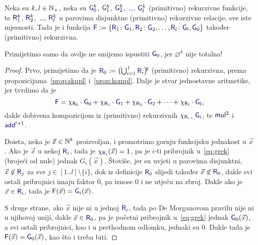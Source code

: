 \begin{teorem}\label{tm:grek}
Neka su $k,l\in{\mathbb N}_+$, neka su $\f G_0^k$, $\f G_1^k$, $\f G_2^k$,~\ldots, $\f G_l^k$ (primitivno) rekurzivne funkcije, te $\f R_1^k$, $\f R_2^k$,~\ldots, $\f R_l^k$ u parovima disjunktne (primitivno) rekurzivne relacije, sve iste mjesnosti. Tada je i funkcija $\f F:=\{\f R_1\colon\f G_1,\f R_2\colon\f G_2,\dotsc,\f R_l\colon\f G_l,\f G_0\}$ također (primitivno) rekurzivna.
\end{teorem}

Primijetimo samo da ovdje ne smijemo ispustiti $\f G_0$, jer $\varnothing^k$ nije totalna!

\begin{proof}
Prvo, primijetimo da je $\f R_0:=\bigl(\bigcup\nolimits_{i=1}^{\,l}\f R_i\bigr)\!\kompl$ (primitivno) rekurzivna, prema propozicijama~\ref{prop:skupl} i~\ref{prop:kompl}. Dalje je stvar jednostavne aritmetike, jer tvrdimo da je
\begin{equation}\label{eq:grek}
    \f F=\chi_{\f R_0}\cdot \f G_0+\chi_{\f R_1}\cdot \f G_1+\chi_{\f R_2}\cdot \f G_2+\dotsb+\chi_{\f R_l}\cdot\f G_l\text,
\end{equation}
dakle dobivena kompozicijom iz (primitivno) rekurzivnih $\chi_{\f R_i}$, $\f G_i$, te $\f{mul}^2$ i $\f{add}^{l+1}$.

Doista, neka je $\vec x\in{\mathbb N}^k$ proizvoljan, i promotrimo gornju funkcijsku jednakost u $\vec x$. Ako je $\vec x$ u nekoj $\f R_i$, tada je $\chi_{\f R_i}(\vec x)=1$, pa je $i$-ti pribrojnik u~\eqref{eq:grek} (brojeći od nule) jednak $G_i(\vec x)$. Štoviše, jer su uvjeti u parovima disjunktni, $\vec x\not\in\f R_j$ za sve $j\in[1..l]\setminus\{i\}$, dok iz definicije $\f R_0$ slijedi također $\vec x\not\in\f R_0$, dakle svi ostali pribrojnici imaju faktor $0$, pa iznose $0$ i ne utječu na zbroj. Dakle ako je $\vec x\in\f R_i$, tada je $\f F(\vec x)=\f G_i(\vec x)$.

S druge strane, ako $\vec x$ nije ni u jednoj $\f R_i$, tada po De Morganovom pravilu nije ni u njihovoj uniji, dakle $\vec x\in\f R_0$, pa je početni pribrojnik u~\eqref{eq:grek} jednak $\f G_0(\vec x)$, a svi ostali pribrojnici, kao i u prethodnom odlomku, jednaki su $0$. Dakle tada je $\f F(\vec x)=\f G_0(\vec x)$, kao što i treba biti.
\end{proof}

